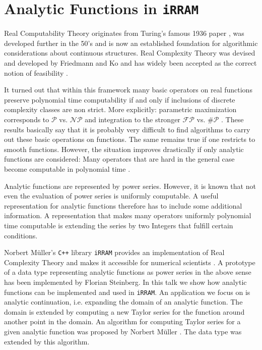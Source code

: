 \documentclass{article}
\newcommand{\p}{\ensuremath{\mathcal P}\xspace}
\newcommand{\np}{\ensuremath{\mathcal{NP}}\xspace}
\newcommand{\fp}{\ensuremath{\mathcal{FP}}\xspace}
\newcommand{\sharpp}{\ensuremath{\# \mathcal{P}}\xspace}
\newcommand{\cc}{\texttt{C++}\xspace}
\newcommand{\irram}{\texttt{iRRAM}\xspace}
\begin{document}
\section*{Analytic Functions in \irram}
	Real Computability Theory originates from Turing's famous 1936 paper \cite{zbMATH03025275}, was developed further in the 50's \cite{MR0089809,MR0105357} and is now an established foundation for algorithmic considerations about continuous structures.
	Real Complexity Theory was devised and developed by Friedmann and Ko \cite{MR666209,MR1137517} and has widely been accepted as the correct notion of feasibility \cite{Weihrauch}.

	It turned out that within this framework many basic operators on real functions preserve polynomial time computability if and only if inclusions of discrete complexity classes are non strict.
	More explicitly: parametric maximization corresponds to $\p$ vs. $\np$ \cite{MR666209} and integration to the stronger $\fp$ vs. $\sharpp$ \cite{MR748898}.
	These results basically say that it is probably very difficult to find algorithms to carry out these basic operations on functions.
	The same remains true if one restricts to smooth functions.
	However, the situation improves drastically if only analytic functions are considered: Many operators that are hard in the general case become computable in polynomial time \cite{Kawamura2012}.

	Analytic functions are represented by power series.
	However, it is known that not even the evaluation of power series is uniformly computable.
	A useful representation for analytic functions therefore has to include some additional information.
	A representation that makes many operators uniformly polynomial time computable is extending the series by two Integers that fulfill certain conditions.

	Norbert Müller's \cc library \irram provides an implementation of Real Complexity Theory and makes it accessible for numerical scientists \cite{Mueller00}.
	A prototype of a data type representing analytic functions as power series in the above sense has been implemented by Florian Steinberg. 
	In this talk we show how analytic functions can be implemented and used in \irram. 
	An application we focus on is analytic continuation, i.e. expanding the domain of an analytic function. The domain is extended by computing a new Taylor series for the function around another point in the domain. An algorithm for computing Taylor series for a given analytic function was proposed by Norbert M\"uller \cite{Mueller95}. The data type was extended by this algorithm.  

{}
\end{document}
